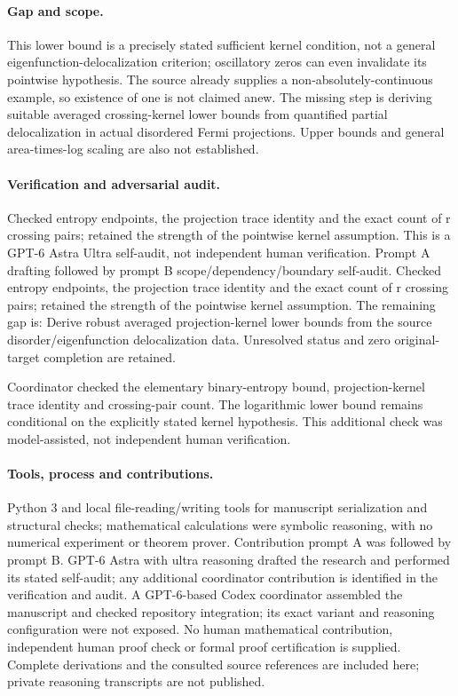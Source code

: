 \documentclass[11pt]{article}
\begin{document}
\paragraph{Gap and scope.} This lower bound is a precisely stated sufficient kernel condition, not a general eigenfunction-delocalization criterion; oscillatory zeros can even invalidate its pointwise hypothesis. The source already supplies a non-absolutely-continuous example, so existence of one is not claimed anew. The missing step is deriving suitable averaged crossing-kernel lower bounds from quantified partial delocalization in actual disordered Fermi projections. Upper bounds and general area-times-log scaling are also not established.

\paragraph{Verification and adversarial audit.}
Checked entropy endpoints, the projection trace identity and the exact count of r crossing pairs; retained the strength of the pointwise kernel assumption. This is a GPT-6 Astra Ultra self-audit, not independent human verification. Prompt A drafting followed by prompt B scope/dependency/boundary self-audit. Checked entropy endpoints, the projection trace identity and the exact count of r crossing pairs; retained the strength of the pointwise kernel assumption. The remaining gap is: Derive robust averaged projection-kernel lower bounds from the source disorder/eigenfunction delocalization data. Unresolved status and zero original-target completion are retained.

Coordinator checked the elementary binary-entropy bound, projection-kernel trace identity and crossing-pair count. The logarithmic lower bound remains conditional on the explicitly stated kernel hypothesis. This additional check was model-assisted, not independent human verification.

\paragraph{Tools, process and contributions.}
Python 3 and local file-reading/writing tools for manuscript serialization and structural checks; mathematical calculations were symbolic reasoning, with no numerical experiment or theorem prover. Contribution prompt A was followed by prompt B. GPT-6 Astra with ultra reasoning drafted the research and performed its stated self-audit; any additional coordinator contribution is identified in the verification and audit. A GPT-6-based Codex coordinator assembled the manuscript and checked repository integration; its exact variant and reasoning configuration were not exposed. No human mathematical contribution, independent human proof check or formal proof certification is supplied. Complete derivations and the consulted source references are included here; private reasoning transcripts are not published.
\end{document}

